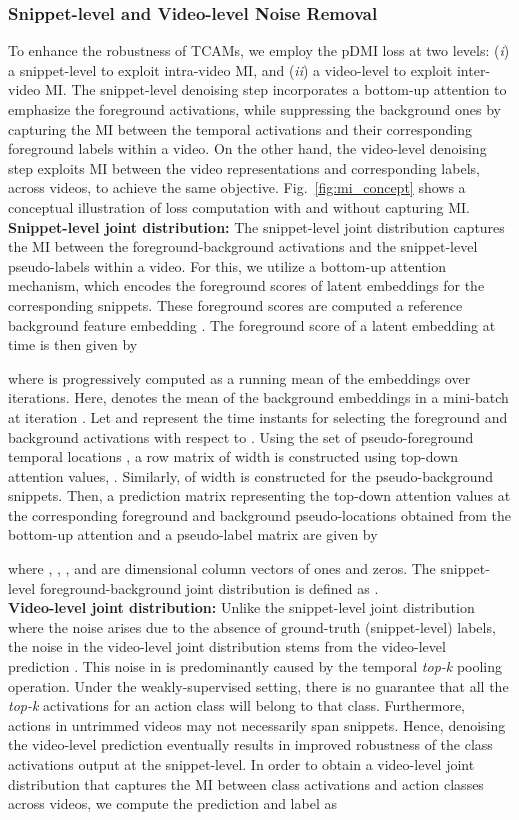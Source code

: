 \documentclass[final]{cvpr}
\begin{document}
\subsubsection{Snippet-level and Video-level Noise Removal}
To enhance the robustness of TCAMs, we employ the pDMI loss  at two levels: (\textit{i}) a snippet-level to exploit intra-video MI, and (\textit{ii}) a video-level to exploit inter-video MI. 
The snippet-level denoising step incorporates a bottom-up attention to emphasize the foreground activations, while suppressing the background ones by capturing the MI between the temporal activations and their corresponding foreground labels within a video. 
On the other hand, the video-level denoising step exploits MI between the video representations and corresponding labels, across videos, to achieve the same objective. 
Fig.~\ref{fig:mi_concept} shows a conceptual illustration of loss computation with and without capturing MI. \\
\noindent\textbf{Snippet-level joint distribution:}
The snippet-level joint distribution captures the MI between the foreground-background activations and the snippet-level pseudo-labels within a video. For this, we utilize a bottom-up attention mechanism, which encodes the foreground scores of latent embeddings for the corresponding snippets. These foreground scores are computed \wrt a reference background feature embedding . 
The foreground score  of a latent embedding  at time  is then given by

where  is progressively computed as a running mean of the embeddings  over  iterations. Here,  denotes the mean of the background embeddings in a mini-batch at iteration . 
Let  and  represent the time instants for selecting the foreground and background activations with respect to . Using the set of pseudo-foreground temporal locations , a row matrix
 of width  is constructed using top-down attention values, . Similarly,  of width  is constructed for the pseudo-background snippets. Then, a prediction matrix  representing the top-down attention values at the corresponding foreground and background pseudo-locations obtained from the bottom-up attention and a pseudo-label matrix  are given by

where , , ,  and  are  dimensional column vectors of ones and zeros. The snippet-level foreground-background joint distribution is defined as .
\\
\textbf{Video-level joint distribution:}
Unlike the snippet-level joint distribution where the noise arises due to the absence of ground-truth (snippet-level) labels, the noise in the video-level joint distribution stems from the video-level prediction . 
This noise in  is predominantly caused by the temporal \textit{top-k} pooling operation. Under the weakly-supervised setting, there is no guarantee that all the \textit{top-k} activations for an action class will belong to that class. Furthermore, actions in untrimmed videos may not necessarily span  snippets. 
Hence, denoising the video-level prediction  eventually results in improved robustness of the class activations output at the snippet-level. In order to obtain a video-level joint distribution  that captures the MI between class activations and action classes across videos, we compute the prediction  and label  as
\end{document}
